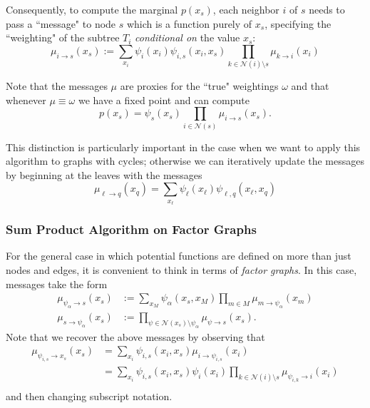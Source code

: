 Consequently, to compute the marginal $p(x_s)$, each neighbor $i$ of $s$ needs to pass a ``message" to node $s$ which is a function purely of $x_s$, specifying the ``weighting" of the subtree $T_i$ \emph{conditional on} the value $x_s$:
$$
\mu_{i\rightarrow s}(x_s) := \sum_{x_i} \psi_i(x_i) \psi_{i,s}(x_i, x_s) \prod_{k \in \mathcal{N}(i) \setminus s} \mu_{k\rightarrow i}(x_i)
$$

Note that the messages $\mu$ are proxies for the ``true" weightings $\omega$ and that whenever $\mu \equiv \omega$ we have a fixed point and can compute 
$$
p(x_s) = \psi_s(x_s) \prod_{i\in\mathcal{N}(s)} \mu_{i\rightarrow s}(x_s).
$$

This distinction is particularly important in the case when we want to apply this algorithm to graphs with cycles; otherwise we can iteratively update the messages by beginning at the leaves with the messages
$$
\mu_{\ell\rightarrow q}(x_q) = \sum_{x_\ell} \psi_\ell(x_\ell) \psi_{\ell,q}(x_\ell, x_q)
$$

\subsubsection{Sum Product Algorithm on Factor Graphs}

For the general case in which potential functions are defined on more than just nodes and edges, it is convenient to think in terms of \emph{factor graphs}.  In this case, messages take the form
\begin{equation*}
\begin{aligned}
\mu_{\psi_\alpha\rightarrow s}(x_s) &:= \sum_{x_M} \psi_\alpha(x_s, x_M) \prod_{m \in M} \mu_{m\rightarrow \psi_\alpha}(x_m)\\
\mu_{s\rightarrow \psi_\alpha}(x_s) &:= \prod_{\psi \in \mathcal{N}(x_s) \setminus \psi_\alpha} \mu_{\psi \rightarrow s}(x_s).
\end{aligned}
\end{equation*}
Note that we recover the above messages by observing that 
\begin{equation*}
\begin{aligned}
\mu_{\psi_{i, s}\rightarrow x_s}(x_s) &= \sum_{x_i} \psi_{i, s}(x_i, x_s) \mu_{i\rightarrow\psi_{i, s}}(x_i)\\
&=\sum_{x_i} \psi_{i, s}(x_i, x_s) \psi_{i}(x_i) \prod_{k \in \mathcal{N}(i) \setminus s} \mu_{\psi_{i, k}\rightarrow i}(x_i)\\
\end{aligned}
\end{equation*}
and then changing subscript notation.

